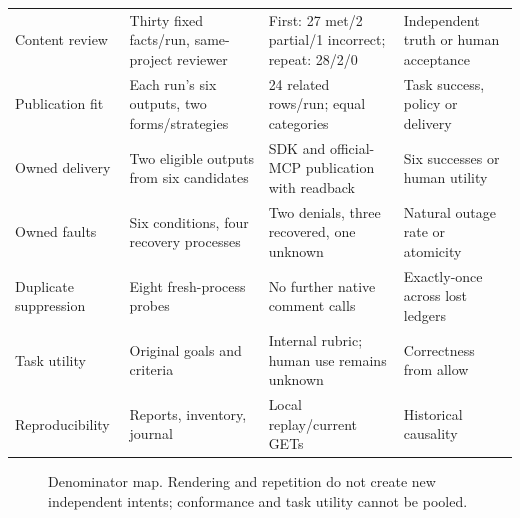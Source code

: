 \documentclass[11pt,letterpaper]{article}
\begin{document}
\begin{longtable}{@{}L{.22\linewidth}L{.27\linewidth}L{.25\linewidth}L{.17\linewidth}@{}}
Content review & Thirty fixed facts/run, same-project reviewer & First: 27 met/2 partial/1 incorrect; repeat: 28/2/0 & Independent truth or human acceptance \\
Publication fit & Each run's six outputs, two forms/strategies & 24 related rows/run; equal categories & Task success, policy or delivery \\
Owned delivery & Two eligible outputs from six candidates & SDK and official-MCP publication with readback & Six successes or human utility \\
Owned faults & Six conditions, four recovery processes & Two denials, three recovered, one unknown & Natural outage rate or atomicity \\
Duplicate suppression & Eight fresh-process probes & No further native comment calls & Exactly-once across lost ledgers \\
Task utility & Original goals and criteria & Internal rubric; human use remains unknown & Correctness from allow \\
Reproducibility & Reports, inventory, journal & Local replay/current GETs & Historical causality \\
\bottomrule
\end{longtable}

\begin{figure}[tbp]
\centering
{}
\caption{Denominator map. Rendering and repetition do not create new
independent intents; conformance and task utility cannot be pooled.}
\label{fig:denominators}
\end{figure}
\end{document}
